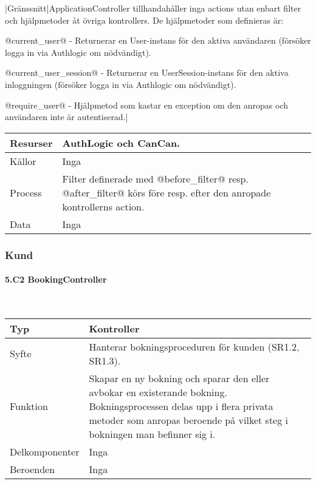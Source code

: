 \documentclass[a4paper, twoside, 11pt, titlepage]{article}
\begin{document}
			|Gränssnitt|ApplicationController tillhandahåller inga actions utan enbart filter och hjälpmetoder åt övriga kontrollers. De hjälpmetoder som definieras är:

			@current\_user@ - Returnerar en User-instans för den aktiva användaren (försöker logga in via Authlogic om nödvändigt).

			@current\_user\_session@ - Returnerar en UserSession-instans för den aktiva inloggningen (försöker logga in via Authlogic om nödvändigt).

			@require\_user@ - Hjälpmetod som kastar en exception om den anropas och användaren inte är autentiserad.|

			\begin {table} [ht] \begin{tabular} {  p{3.5cm} p{9.6cm} }
				\hline
				Resurser & AuthLogic och CanCan.  \\
				\hline
				Källor & Inga  \\
				\hline
				Process & Filter definerade med @before\_filter@ resp. @after\_filter@ körs före resp. efter den anropade kontrollerns action.  \\
				\hline
				Data & Inga  \\
				\hline
			\end{tabular} \end{table} \FloatBarrier


		\subsubsection{Kund}



			\paragraph{5.C2 BookingController}\

			\begin {table} [ht] \begin{tabular} {  p{3.5cm} p{9.6cm} }
				\hline
				Typ & Kontroller  \\
				\hline
				Syfte & Hanterar bokningsproceduren för kunden (SR1.2, SR1.3).  \\
				\hline
				Funktion & Skapar en ny bokning och sparar den eller avbokar en existerande bokning. Bokningsprocessen delas upp i flera privata metoder som anropas beroende på vilket steg i bokningen man befinner sig i.  \\
				\hline
				Delkomponenter & Inga  \\
				\hline
				Beroenden & Inga  \\
				\hline
			\end{tabular} \end{table} \FloatBarrier
			\vspace{6mm}
\end{document}

